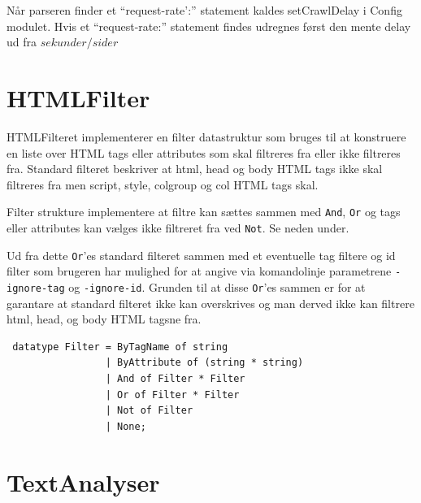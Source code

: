 \documentclass[a4paper,oneside,article]{memoir}
\begin{document}
Når parseren finder et ``request-rate':'' statement kaldes
setCrawlDelay i Config modulet. Hvis et ``request-rate:'' statement
findes udregnes først den mente delay ud fra $sekunder / sider$

\section{HTMLFilter}

HTMLFilteret implementerer en filter datastruktur som bruges til at
konstruere en liste over HTML tags eller attributes som skal filtreres
fra eller ikke filtreres fra.  Standard filteret beskriver at html,
head og body HTML tags ikke skal filtreres fra men script, style,
colgroup og col HTML tags skal.

Filter strukture implementere at filtre kan sættes sammen med
\texttt{And}, \texttt{Or} og tags eller attributes kan vælges ikke
filtreret fra ved \texttt{Not}. Se neden under.

Ud fra dette \texttt{Or}'es standard filteret sammen med et eventuelle
tag filtere og id filter som brugeren har mulighed for at angive via
komandolinje parametrene \texttt{-ignore-tag} og
\texttt{-ignore-id}. Grunden til at disse \texttt{Or}'es sammen er for
at garantare at standard filteret ikke kan overskrives og man derved
ikke kan filtrere html, head, og body HTML tagsne fra.

\begin{verbatim}
 datatype Filter = ByTagName of string
                 | ByAttribute of (string * string)
                 | And of Filter * Filter
                 | Or of Filter * Filter
                 | Not of Filter
                 | None;
\end{verbatim}


\section{TextAnalyser}
\end{document}
